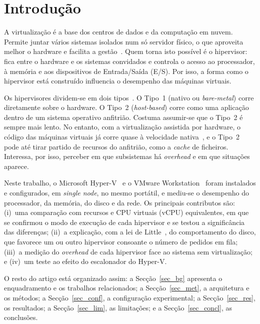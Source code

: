 \documentclass[conference]{IEEEtran}
\begin{document}
\section{Introdução}\label{sec_intro}
A virtualização é a base dos centros de dados e da computação em nuvem. Permite juntar vários sistemas isolados num só servidor físico, o que aproveita melhor o hardware e facilita a gestão~\cite{b3,b4}. Quem torna isto possível é o hipervisor: fica entre o hardware e os sistemas convidados e controla o acesso ao processador, à memória e aos dispositivos de Entrada/Saída (E/S). Por isso, a forma como o hipervisor está construído influencia o desempenho das máquinas virtuais.

Os hipervisores dividem-se em dois tipos~\cite{b7,b4}. O Tipo~1 (nativo ou \textit{bare-metal}) corre diretamente sobre o hardware. O Tipo~2 (\textit{host-based}) corre como uma aplicação dentro de um sistema operativo anfitrião. Costuma assumir-se que o Tipo~2 é sempre mais lento. No entanto, com a virtualização assistida por hardware, o código das máquinas virtuais já corre quase à velocidade nativa~\cite{b9,b10}, e o Tipo~2 pode até tirar partido de recursos do anfitrião, como a \textit{cache} de ficheiros. Interessa, por isso, perceber em que subsistemas há \textit{overhead} e em que situações aparece.

Neste trabalho, o Microsoft Hyper-V~\cite{b1} e o VMware Workstation~\cite{b2} foram instalados e configurados, em \textit{single node}, no mesmo portátil, e mediu-se o desempenho do processador, da memória, do disco e da rede. Os principais contributos são: (i)~uma comparação com recursos e CPU virtuais (vCPU) equivalentes, em que se confirmou o modo de execução de cada hipervisor e se testou a significância das diferenças; (ii)~a explicação, com a lei de Little~\cite{b14}, do comportamento do disco, que favorece um ou outro hipervisor consoante o número de pedidos em fila; (iii)~a medição do \textit{overhead} de cada hipervisor face ao sistema sem virtualização; e (iv)~um teste ao efeito do escalonador do Hyper-V.

O resto do artigo está organizado assim: a Secção~\ref{sec_bg} apresenta o enquadramento e os trabalhos relacionados; a Secção~\ref{sec_met}, a arquitetura e os métodos; a Secção~\ref{sec_conf}, a configuração experimental; a Secção~\ref{sec_res}, os resultados; a Secção~\ref{sec_lim}, as limitações; e a Secção~\ref{sec_concl}, as conclusões.

\end{document}
